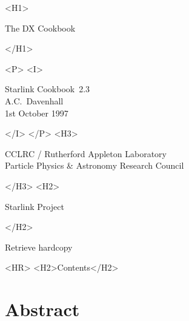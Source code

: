 \documentclass[twoside,11pt]{article}
\newcommand{\stardoccategory}  {Starlink Cookbook}
\newcommand{\stardocsource}    {sc\stardocnumber}
\newcommand{\stardocnumber}    {2.3}
\newcommand{\stardocauthors}   {A.C.~Davenhall}
\newcommand{\stardocdate}      {1st October 1997}
\newcommand{\stardoctitle}     {The DX Cookbook}
\newcommand{\htmladdnormallink}[2]{#1}
\newcommand{\htmladdimg}[1]{}
\newcommand{\htmlref}[2]{#1}
\newcommand{\htmladdtonavigation}[1]{}
\newcommand{\xlabel}[1]{}
\begin{document}
\begin{htmlonly}
   \xlabel{}
   \begin{rawhtml} <H1> \end{rawhtml}
      \stardoctitle
   \begin{rawhtml} </H1> \end{rawhtml}


   \begin{rawhtml} <P> <I> \end{rawhtml}
   \stardoccategory\ \stardocnumber \\
   \stardocauthors \\
   \stardocdate
   \begin{rawhtml} </I> </P> <H3> \end{rawhtml}
      \htmladdnormallink{CCLRC}{http://www.cclrc.ac.uk} /
      \htmladdnormallink{Rutherford Appleton Laboratory}
                        {http://www.cclrc.ac.uk/ral} \\
      \htmladdnormallink{Particle Physics \& Astronomy Research Council}
                        {http://www.pparc.ac.uk} \\
   \begin{rawhtml} </H3> <H2> \end{rawhtml}
      \htmladdnormallink{Starlink Project}{http://www.starlink.ac.uk/}
   \begin{rawhtml} </H2> \end{rawhtml}
   \htmladdnormallink{\htmladdimg{source.gif} Retrieve hardcopy}
      {http://www.starlink.ac.uk/cgi-bin/hcserver?\stardocsource}\\

  \label{stardoccontents}
  \begin{rawhtml}
    <HR>
    <H2>Contents</H2>
  \end{rawhtml}
  \htmladdtonavigation{\htmlref{\htmladdimg{contents_motif.gif}}
        {stardoccontents}}


  \section{\xlabel{abstract}Abstract}
\end{htmlonly}
\end{document}
